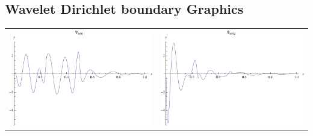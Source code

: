 \documentclass{article}
\begin{document}
\begin{landscape}
\subsection{Wavelet Dirichlet boundary Graphics}
\begin{tabular}{cc}
\includegraphics[width=10.cm]{nonic_wavelet_dleft_1.pdf}& \includegraphics[width=10.cm]{nonic_wavelet_dleft_2.pdf} \\
\end{tabular} 
 \\ 
\begin{tabular}{cc}

\end{tabular}
\end{landscape}
\end{document}
